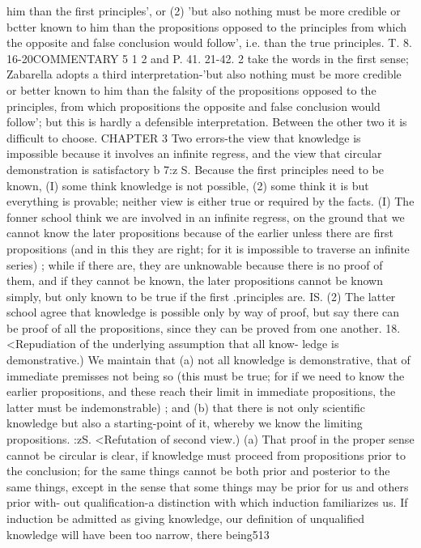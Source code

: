 {him than the first principles', or (2) 'but also nothing must be
more credible or bctter known to him than the propositions
opposed to the principles from which the opposite and false
conclusion would follow', i.e. than the true principles. T. 8. 16-20COMMENTARY
5 1 2
and P. 41. 21-42. 2 take the words in the first sense; Zabarella
adopts a third interpretation-'but also nothing must be more
credible or better known to him than the falsity of the propositions
opposed to the principles, from which propositions the opposite
and false conclusion would follow'; but this is hardly a defensible
interpretation. Between the other two it is difficult to choose.
CHAPTER 3
Two errors-the view that knowledge is impossible because it involves
an infinite regress, and the view that circular demonstration is
satisfactory
b
7:z S. Because the first principles need to be known, (I) some
think knowledge is not possible, (2) some think it is but everything
is provable; neither view is either true or required by the facts.
(I) The fonner school think we are involved in an infinite regress,
on the ground that we cannot know the later propositions because
of the earlier unless there are first propositions (and in this they
are right; for it is impossible to traverse an infinite series) ; while
if there are, they are unknowable because there is no proof of
them, and if they cannot be known, the later propositions cannot
be known simply, but only known to be true if the first .principles
are.
IS. (2) The latter school agree that knowledge is possible only
by way of proof, but say there can be proof of all the propositions,
since they can be proved from one another.
18. <Repudiation of the underlying assumption that all know-
ledge is demonstrative.) We maintain that (a) not all knowledge
is demonstrative, that of immediate premisses not being so (this
must be true; for if we need to know the earlier propositions,
and these reach their limit in immediate propositions, the latter
must be indemonstrable) ; and (b) that there is not only scientific
knowledge but also a starting-point of it, whereby we know the
limiting propositions.
:zS. <Refutation of second view.) (a) That proof in the proper
sense cannot be circular is clear, if knowledge must proceed from
propositions prior to the conclusion; for the same things cannot
be both prior and posterior to the same things, except in the
sense that some things may be prior for us and others prior with-
out qualification-a distinction with which induction familiarizes
us. If induction be admitted as giving knowledge, our definition
of unqualified knowledge will have been too narrow, there being513
}
